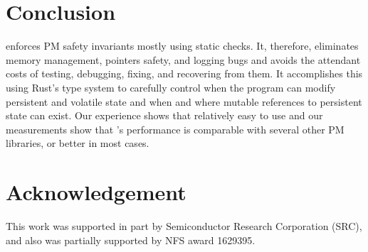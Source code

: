 \section{Conclusion}
\label{sec:conclude}

\This{} enforces PM safety invariants mostly using static checks.  It,
therefore, eliminates memory management, pointers safety, and logging bugs and
avoids the attendant costs of testing, debugging, fixing, and recovering from
them.  It accomplishes this using Rust's type system to carefully control when
the program can modify persistent and volatile state and when and where mutable
references to persistent state can exist.  Our experience shows that \this{}
relatively easy to use and our measurements show that \this{}'s performance is
comparable with several other PM libraries, or better in most cases.

\section*{Acknowledgement}

This work was supported in part by Semiconductor Research Corporation (SRC),
and also was partially supported by NFS award 1629395.